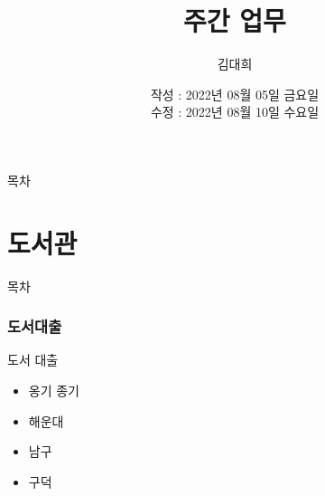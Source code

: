 \documentclass[aspectratio=1610,17pt,xcolor=pdftex,dvipsnames,table,handout]{beamer}
\begin{document}
	

			\title{주간 업무 }

			\author{김대희}

			\date{ 	작성 : 2022년 	08월 05일 금요일 \\
					수정 : 2022년 08월 10일 수요일}



		\begin{frame}[plain]
		\titlepage
		\end{frame}



		\begin{frame} {목차}
		\tableofcontents
		\end{frame}

		\part{도서관 }
		\frame{\partpage}


		\begin{frame} [plain]{목차}
		\tableofcontents
		\end{frame}
		

		\section{도서대출}
		

		\begin{frame} [t,plain]
			\begin{block} {도서 대출}
			\begin{itemize}
				\item 옹기 종기 
				\item 해운대
				\item 남구
				\item 구덕 
			\end{itemize}
			\end{block}
		\end{frame}
\end{document}
